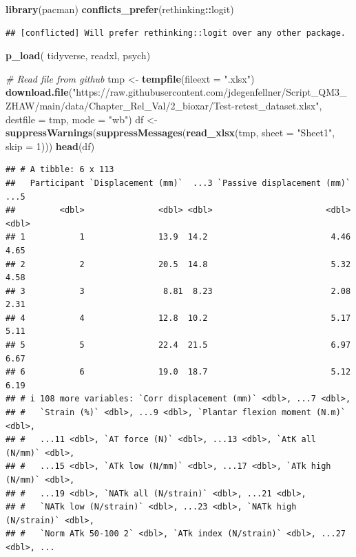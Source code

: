 \documentclass[
]{book}
\newenvironment{Shaded}{\begin{snugshade}}{\end{snugshade}}
\newcommand{\AttributeTok}[1]{\textcolor[rgb]{0.13,0.29,0.53}{#1}}
\newcommand{\CommentTok}[1]{\textcolor[rgb]{0.56,0.35,0.01}{\textit{#1}}}
\newcommand{\DecValTok}[1]{\textcolor[rgb]{0.00,0.00,0.81}{#1}}
\newcommand{\FunctionTok}[1]{\textcolor[rgb]{0.13,0.29,0.53}{\textbf{#1}}}
\newcommand{\NormalTok}[1]{#1}
\newcommand{\OtherTok}[1]{\textcolor[rgb]{0.56,0.35,0.01}{#1}}
\newcommand{\SpecialCharTok}[1]{\textcolor[rgb]{0.81,0.36,0.00}{\textbf{#1}}}
\newcommand{\StringTok}[1]{\textcolor[rgb]{0.31,0.60,0.02}{#1}}
\begin{document}
\begin{Shaded}
\begin{Highlighting}[]
\FunctionTok{library}\NormalTok{(pacman)}
\FunctionTok{conflicts\_prefer}\NormalTok{(rethinking}\SpecialCharTok{::}\NormalTok{logit)}
\end{Highlighting}
\end{Shaded}

\begin{verbatim}
## [conflicted] Will prefer rethinking::logit over any other package.
\end{verbatim}

\begin{Shaded}
\begin{Highlighting}[]
\FunctionTok{p\_load}\NormalTok{(}
\NormalTok{  tidyverse,}
\NormalTok{  readxl,}
\NormalTok{  psych)}

\CommentTok{\# Read file from github}
\NormalTok{tmp }\OtherTok{\textless{}{-}} \FunctionTok{tempfile}\NormalTok{(}\AttributeTok{fileext =} \StringTok{".xlsx"}\NormalTok{)}
\FunctionTok{download.file}\NormalTok{(}\StringTok{"https://raw.githubusercontent.com/jdegenfellner/Script\_QM3\_ZHAW/main/data/Chapter\_Rel\_Val/2\_bioxar/Test{-}retest\_dataset.xlsx"}\NormalTok{, }
              \AttributeTok{destfile =}\NormalTok{ tmp, }\AttributeTok{mode =} \StringTok{"wb"}\NormalTok{)}
\NormalTok{df }\OtherTok{\textless{}{-}} \FunctionTok{suppressWarnings}\NormalTok{(}\FunctionTok{suppressMessages}\NormalTok{(}\FunctionTok{read\_xlsx}\NormalTok{(tmp, }\AttributeTok{sheet =} \StringTok{"Sheet1"}\NormalTok{, }\AttributeTok{skip =} \DecValTok{1}\NormalTok{)))}
\FunctionTok{head}\NormalTok{(df)}
\end{Highlighting}
\end{Shaded}

\begin{verbatim}
## # A tibble: 6 x 113
##   Participant `Displacement (mm)`  ...3 `Passive displacement (mm)`  ...5
##         <dbl>               <dbl> <dbl>                       <dbl> <dbl>
## 1           1               13.9  14.2                         4.46  4.65
## 2           2               20.5  14.8                         5.32  4.58
## 3           3                8.81  8.23                        2.08  2.31
## 4           4               12.8  10.2                         5.17  5.11
## 5           5               22.4  21.5                         6.97  6.67
## 6           6               19.0  18.7                         5.12  6.19
## # i 108 more variables: `Corr displacement (mm)` <dbl>, ...7 <dbl>,
## #   `Strain (%)` <dbl>, ...9 <dbl>, `Plantar flexion moment (N.m)` <dbl>,
## #   ...11 <dbl>, `AT force (N)` <dbl>, ...13 <dbl>, `AtK all (N/mm)` <dbl>,
## #   ...15 <dbl>, `ATk low (N/mm)` <dbl>, ...17 <dbl>, `ATk high (N/mm)` <dbl>,
## #   ...19 <dbl>, `NATk all (N/strain)` <dbl>, ...21 <dbl>,
## #   `NATk low (N/strain)` <dbl>, ...23 <dbl>, `NATk high (N/strain)` <dbl>,
## #   `Norm ATk 50-100 2` <dbl>, `ATk index (N/strain)` <dbl>, ...27 <dbl>, ...
\end{verbatim}
\end{document}
